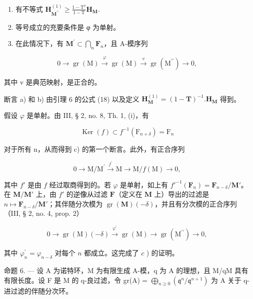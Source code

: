\begin{enumerate}
\def\labelenumi{\alph{enumi})}
\item
  有不等式 \(\mathbf{H}_{\mathbf{M}^{\prime \prime}}^{(1)}\geqslant \frac{1 - \mathrm{T}^{\delta}}{1 - \mathrm{T}}\mathbf{H}_{\mathbf{M}}.\)
\item
  等号成立的充要条件是 φ 为单射。
\item
  在此情况下，有 \(\mathbf{M}^{\prime}\subset \bigcap_{n}\mathbf{F}_{n}\)，且 A-模序列
\end{enumerate}

\[
0 \longrightarrow \operatorname{gr} (\mathrm{M}) \stackrel {\varphi} {\longrightarrow} \operatorname{gr} (\mathrm{M}) \stackrel {v} {\longrightarrow} \operatorname{gr} (\mathrm{M} ^ {\prime \prime}) \longrightarrow 0,
\]

其中 v 是典范映射，是正合的。

断言 a) 和 b) 由引理 6 的公式 (18) 以及定义 \(\mathbf{H}_{\mathbf{M}}^{(1)} = (1 - \mathbf{T})^{-1}.\mathbf{H}_{\mathbf{M}}\) 得到。

假设 \(\varphi\) 是单射。由 III, § 2, no. 8, Th. 1, (i)，有

\[
\operatorname{Ker} (f) \subset f ^ {- 1} (\mathrm{F} _ {n + \delta}) = \mathrm{F} _ {n}
\]

对于所有 n，从而得到 c) 的第一个断言。此外，有正合序列

\[
0 \longrightarrow \mathrm{M} / \mathrm{M} ^ {\prime} \stackrel {f ^ {\prime}} {\longrightarrow} \mathrm{M} \longrightarrow \mathrm{M} / f (\mathrm{M}) \longrightarrow 0,
\]

其中 \(f'\) 是由 \(f\) 经过取商得到的。若 \(\varphi\) 是单射，如上有 \(f'^{-1}(\mathbf{F}_n) = \mathbf{F}_{n-\delta}/\mathbf{M}'\)。在 \(\mathbf{M}/\mathbf{M}'\) 上，由 \(f'\) 的逆像从过滤 \(\mathbf{F}\)（定义在 \(\mathbf{M}\) 上）导出的过滤是 \(n \mapsto \mathbf{F}_{n-\delta}/\mathbf{M}'\)；其伴随分次模为 \(\operatorname{gr}(\mathbf{M})(-\delta)\)，并且有分次模的正合序列（III, § 2, no. 4, prop. 2）

\[
0 \longrightarrow \operatorname{gr} (\mathrm{M}) (- \delta) \xrightarrow {\varphi^ {\prime}} \operatorname{gr} (\mathrm{M}) \longrightarrow \operatorname{gr} \left(\mathrm{M} ^ {\prime \prime}\right) \longrightarrow 0,
\]

其中 \(\varphi_{n}^{\prime} = \varphi_{n - \delta}\) 对每个 \(n\) 都成立。这完成了 \(c\) ) 的证明。

命题 6. — 设 A 为诺特环，M 为有限生成 A-模，q 为 A 的理想，且 M/qM 具有有限长度。设 F 是 M 的 q-良过滤，令 gr(A) = \(\bigoplus_{n\geqslant 0}(\mathfrak{q}^n /\mathfrak{q}^{n + 1})\) 为 A 关于 q-进过滤的伴随分次环。

